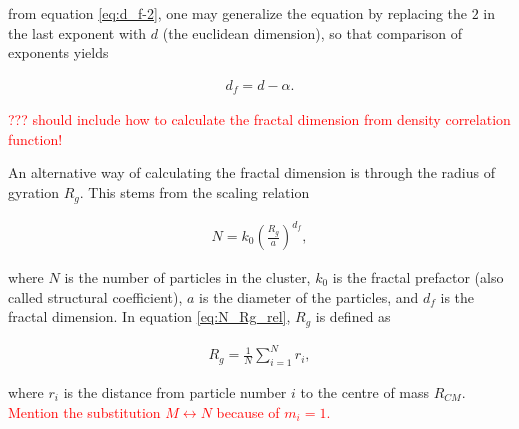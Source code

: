 from equation \eqref{eq:d_f-2}, one may generalize the equation by replacing the $2$ in the last exponent with $d$ (the euclidean dimension), so that comparison of exponents yields 

\begin{align}
d_f = d - \alpha.
\label{eq:d_f corr}
\end{align}

\textcolor{red}{??? should include how to calculate the fractal dimension from density correlation function!}

An alternative way of calculating the fractal dimension is through the radius of gyration $R_g$. This stems from the scaling relation 

\begin{align}
N = k_0\left(\frac{R_g}{a}\right)^{d_f},
\label{eq:N_Rg_rel}
\end{align}

where $N$ is the number of particles in the cluster, $k_0$ is the fractal prefactor (also called structural coefficient), $a$ is the diameter of the particles, and $d_f$ is the fractal dimension. In equation \eqref{eq:N_Rg_rel}, $R_g$ is defined as 

\begin{align}
R_g = \frac{1}{N} \sum_{i=1}^{N} r_i, 
\end{align}

where $r_i$ is the distance from particle number $i$ to the centre of mass $R_{CM}$. \textcolor{red}{Mention the substitution $M \leftrightarrow N$ because of $m_i = 1$. }